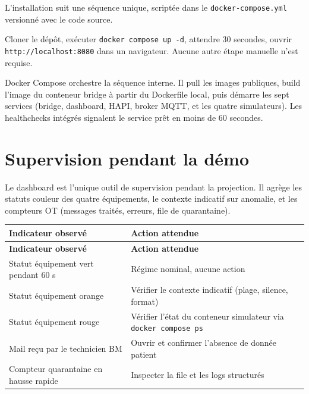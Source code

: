 L'installation suit une séquence unique, scriptée dans le \texttt{docker-compose.yml} versionné avec le code source.

\begin{bridgeinfo}
Cloner le dépôt, exécuter \texttt{docker compose up -d}, attendre 30 secondes, ouvrir \texttt{http://localhost:8080} dans un navigateur. Aucune autre étape manuelle n'est requise.
\end{bridgeinfo}

Docker Compose orchestre la séquence interne. Il pull les images publiques, build l'image du conteneur bridge à partir du Dockerfile local, puis démarre les sept services (bridge, dashboard, HAPI, broker MQTT, et les quatre simulateurs). Les healthchecks intégrés signalent le service prêt en moins de 60 secondes.

\section{Supervision pendant la démo}
\label{sec:deploiement-supervision}

Le dashboard est l'unique outil de supervision pendant la projection. Il agrège les statuts couleur des quatre équipements, le contexte indicatif sur anomalie, et les compteurs OT (messages traités, erreurs, file de quarantaine).

\bridgezebra
\begin{longtable}{p{6cm}p{8cm}}
  \toprule
  \rowcolor{bridgeblue!90}
  {\color{white}\bfseries Indicateur observé} & {\color{white}\bfseries Action attendue} \\
  \midrule
  \endfirsthead
  \toprule
  \rowcolor{bridgeblue!90}
  {\color{white}\bfseries Indicateur observé} & {\color{white}\bfseries Action attendue} \\
  \midrule
  \endhead
  \bottomrule
  \endfoot
  Statut équipement vert pendant 60 s     & Régime nominal, aucune action \\
  Statut équipement orange                & Vérifier le contexte indicatif (plage, silence, format) \\
  Statut équipement rouge                 & Vérifier l'état du conteneur simulateur via \texttt{docker compose ps} \\
  Mail reçu par le technicien BM          & Ouvrir et confirmer l'absence de donnée patient \\
  Compteur quarantaine en hausse rapide   & Inspecter la file et les logs structurés \\
\end{longtable}

